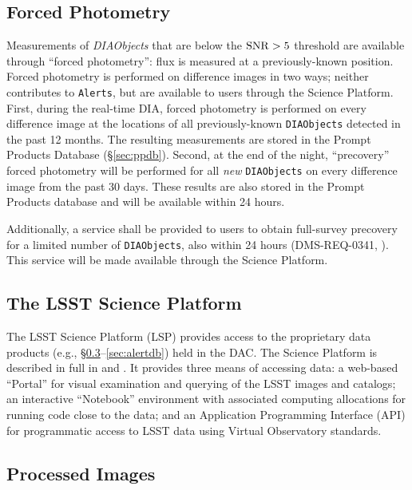 \subsection{Forced Photometry}\label{sec:AGP_force}

Measurements of \textit{DIAObjects} that are below the ${\rm SNR} > 5$ threshold are available through ``forced photometry'': flux is measured at a previously-known position.
Forced photometry is performed on difference images in two ways; neither contributes to \texttt{Alerts}, but are available to users through the Science Platform.
First, during the real-time DIA, forced photometry is performed on every difference image at the locations of all previously-known {\tt DIAObjects} detected in the past 12 months. 
The resulting measurements are stored in the Prompt Products Database (\S \ref{sec:ppdb}).
Second, at the end of the night, ``precovery'' forced photometry will be performed for all \textit{new} \texttt{DIAObjects} on every difference image from the past 30 days.
These results are also stored in the Prompt Products database and will be available within 24 hours.
 
Additionally, a service shall be provided to users to obtain full-survey precovery for a limited number of {\tt DIAObjects}, also within 24 hours (DMS-REQ-0341, ).
This service will be made available through the Science Platform.

\subsection{The LSST Science Platform} \label{sec:LSP}

The LSST Science Platform (LSP) provides access to the proprietary data products (e.g., \S \ref{sec:products}--\ref{sec:alertdb}) held in the DAC.
The Science Platform is described in full in  and .
It provides three means of accessing data: a web-based ``Portal'' for visual examination and querying of the LSST images and catalogs; 
an interactive ``Notebook'' environment with associated computing allocations for running code close to the data; 
and an Application Programming Interface (API) for programmatic access to LSST data using Virtual Observatory standards.

\subsection{Processed Images} \label{sec:products}

